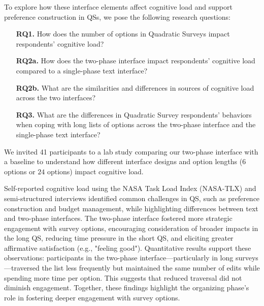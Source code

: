 To explore how these interface elements affect cognitive load and support preference construction in QSs, we pose the following research questions:
\begin{itemize}
    \item [\textbf{RQ1.}] How does the number of options in Quadratic Surveys impact respondents' cognitive load?
    \item [\textbf{RQ2a.}] How does the two-phase interface impact respondents' cognitive load compared to a single-phase text interface?
    \item [\textbf{RQ2b.}] What are the similarities and differences in sources of cognitive load across the two interfaces?
    \item [\textbf{RQ3.}] What are the differences in Quadratic Survey respondents' behaviors when coping with long lists of options across the two-phase interface and the single-phase text interface?
\end{itemize}


We invited 41 participants to a lab study comparing our two-phase interface with a baseline to understand how different interface designs and option lengths ($6$ options or $24$ options) impact cognitive load. 

Self-reported cognitive load using the NASA Task Load Index (NASA-TLX) and semi-structured interviews identified common challenges in QS, such as preference construction and budget management, while highlighting differences between text and two-phase interfaces. The two-phase interface fostered more strategic engagement with survey options, encouraging consideration of broader impacts in the long QS, reducing time pressure in the short QS, and eliciting greater affirmative satisfaction (e.g., "feeling good"). Quantitative results support these observations: participants in the two-phase interface—particularly in long surveys—traversed the list less frequently but maintained the same number of edits while spending more time per option. This suggests that reduced traversal did not diminish engagement. Together, these findings highlight the organizing phase's role in fostering deeper engagement with survey options.


